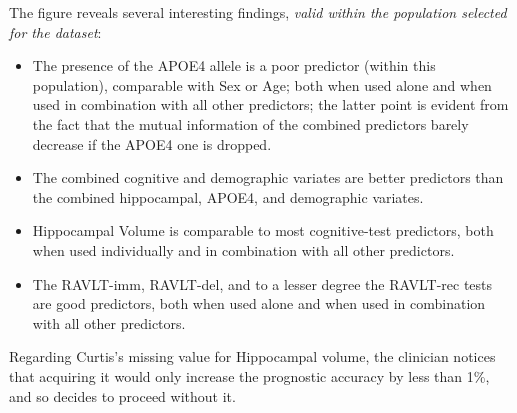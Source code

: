 \documentclass[utf8]{FrontiersinHarvard} %
\renewcommand*{\|}[1][]{\nonscript\:#1\vert\nonscript\:\mathopen{}}
\begin{document}
The figure reveals several interesting findings, \emph{valid within the population selected for the dataset}:
\begin{itemize}
\item The presence of the APOE4 allele is a poor predictor (within this population), comparable with Sex or Age; both when used alone and when used in combination with all other predictors; the latter point is evident from the fact that the mutual information of the combined predictors barely decrease if the APOE4 one is dropped.
\item The combined cognitive and demographic variates are better predictors than the combined hippocampal, APOE4, and demographic variates.
\item Hippocampal Volume is comparable to most cognitive-test predictors, both when used individually and in combination with all other predictors.
\item The \textsf{RAVLT-imm}, \textsf{RAVLT-del}, and to a lesser degree the \textsf{RAVLT-rec} tests are good predictors, both when used alone and when used in combination with all other predictors.
\end{itemize}

Regarding Curtis's missing value for Hippocampal volume, the clinician notices that acquiring it would only increase the prognostic accuracy by less than 1\%, and so decides to proceed without it.
\end{document}
